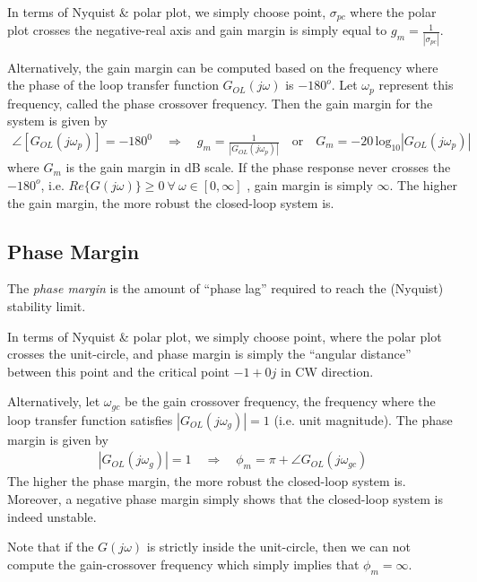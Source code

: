 \documentclass[twoside]{article}
\begin{document}
In terms of Nyquist \& polar plot, we simply choose point,
$\sigma_{pc}$ where the polar plot crosses the negative-real axis
and gain margin is simply equal to  $g_m = \frac{1}{| \sigma_{pc} |}$. 

Alternatively, the gain margin can be computed based on 
the frequency where the phase of the loop transfer function
$G_{OL}(j \omega)$ is $-180^o$. Let $\omega_{p}$ represent this frequency,
called the phase crossover frequency. Then the gain margin for the
system is given by
%
\begin{align*}
  \angle [ G_{OL}(j \omega_{p}) ] = -180^0
  \quad \Rightarrow \quad 
  g_m = \frac{1}{| G_{OL}(j \omega_{p})| } \quad \mathrm{or} \quad G_m
  = -20 \,
  \mathrm{log}_{10} | G_{OL}(j \omega_{p} ) |
\end{align*}
%
where $G_m$ is the gain margin in dB scale. If the phase response never crosses the $-180^o$,  
i.e. $Re \lbrace G(j \omega) \rbrace \geq 0 \ \forall \ \omega \in [0,\infty]$
, gain margin is simply $\infty$.
The higher the gain margin, the more robust the closed-loop
system is. 

\subsection*{Phase Margin}

The \textit{phase margin} is the amount of ``phase lag'' required to
reach the (Nyquist) stability limit. 

In terms of Nyquist \& polar plot, we simply choose point,
where the polar plot crosses the unit-circle, and phase margin 
is simply the ``angular distance'' between this point and the
critical point $-1 + 0 j$ in CW direction. 

Alternatively, let $\omega_{gc}$ be the gain crossover frequency,
 the frequency where the loop transfer function satisfies $| G_{OL}(j \omega_g)
 | = 1$ (i.e. unit magnitude). The phase margin 
is given by
%
\begin{align*}
  | G_{OL}(j \omega_g) | = 1 \quad \Rightarrow \quad
  \phi_m = \pi + \angle G_{OL} (j \omega_{gc})
\end{align*}
% 
The higher the phase margin, the more robust the closed-loop
system is. Moreover, a negative phase margin simply shows that the closed-loop 
system is indeed unstable. 

Note that if the $G(j \omega)$ is strictly inside the unit-circle,
then we can not compute the gain-crossover frequency which 
simply implies that $\phi_m = \infty$. 
\end{document}

